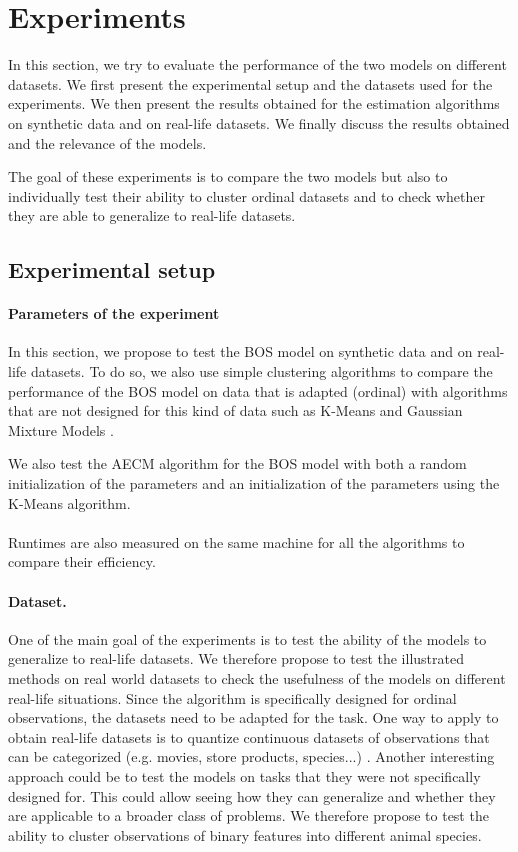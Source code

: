 \section{Experiments}
In this section, we try to evaluate the performance of the two models on different datasets. We first present the experimental setup and the datasets used for the experiments. We then present the results obtained for the estimation algorithms on synthetic data and on real-life datasets. We finally discuss the results obtained and the relevance of the models. 

The goal of these experiments is to compare the two models but also to individually test their ability to cluster ordinal datasets and to check whether they are able to generalize to real-life datasets. 

\subsection{Experimental setup}
\paragraph{Parameters of the experiment}
In this section, we propose to test the BOS model on synthetic data and on real-life datasets. 
To do so, we also use simple clustering algorithms to compare the performance of the BOS model on data that is adapted (ordinal) with algorithms that are not designed for this kind of data such as K-Means \citep{macqueen1967some} and Gaussian Mixture Models \citep{reynolds2009gaussian}.

We also test the AECM algorithm for the BOS model with both a random initialization of the parameters and an initialization of the parameters using the K-Means algorithm. \\ \\
Runtimes are also measured on the same machine for all the algorithms to compare their efficiency.
\paragraph{Dataset.} One of the main goal of the experiments is to test the ability of the models to generalize to real-life datasets. We therefore propose to test the illustrated methods on real world datasets to check the usefulness of the models on different real-life situations. Since the algorithm is specifically designed for ordinal observations, the datasets need to be adapted for the task. One way to apply to obtain real-life datasets is to quantize continuous datasets of observations that can be categorized (e.g. movies, store products, species...) \citep{skubacz2000quantization}. Another interesting approach could be to test the models on tasks that they were not specifically designed for. This could allow seeing how they can generalize and whether they are applicable to a broader class of problems. We therefore propose to test the ability to cluster observations of binary features into different animal species.
